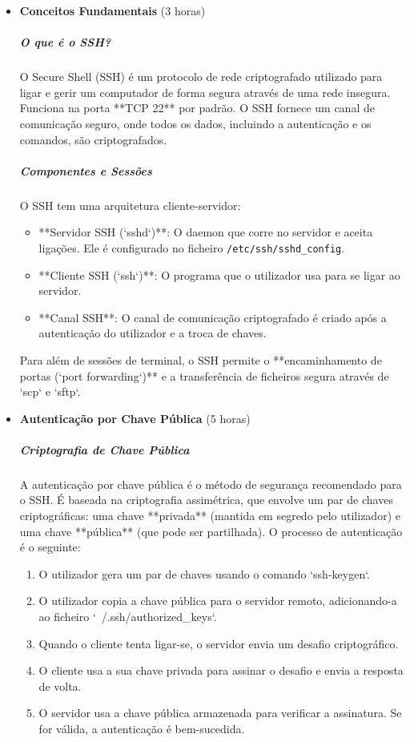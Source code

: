 \documentclass[10pt,a4paper]{article}
\begin{document}
	\begin{itemize}
		\item \textbf{Conceitos Fundamentais} (3 horas)
		\subparagraph{O que é o SSH?} O Secure Shell (SSH) é um protocolo de rede criptografado utilizado para ligar e gerir um computador de forma segura através de uma rede insegura. Funciona na porta **TCP 22** por padrão. O SSH fornece um canal de comunicação seguro, onde todos os dados, incluindo a autenticação e os comandos, são criptografados.
		\subparagraph{Componentes e Sessões} O SSH tem uma arquitetura cliente-servidor:
		\begin{itemize}
			\item **Servidor SSH (`sshd`)**: O daemon que corre no servidor e aceita ligações. Ele é configurado no ficheiro \texttt{/etc/ssh/sshd\_config}.
			\item **Cliente SSH (`ssh`)**: O programa que o utilizador usa para se ligar ao servidor.
			\item **Canal SSH**: O canal de comunicação criptografado é criado após a autenticação do utilizador e a troca de chaves.
		\end{itemize}
		Para além de sessões de terminal, o SSH permite o **encaminhamento de portas (`port forwarding`)** e a transferência de ficheiros segura através de `scp` e `sftp`.
		
		\item \textbf{Autenticação por Chave Pública} (5 horas)
		\subparagraph{Criptografia de Chave Pública} A autenticação por chave pública é o método de segurança recomendado para o SSH. É baseada na criptografia assimétrica, que envolve um par de chaves criptográficas: uma chave **privada** (mantida em segredo pelo utilizador) e uma chave **pública** (que pode ser partilhada). O processo de autenticação é o seguinte:
		\begin{enumerate}
			\item O utilizador gera um par de chaves usando o comando `ssh-keygen`.
			\item O utilizador copia a chave pública para o servidor remoto, adicionando-a ao ficheiro `~/.ssh/authorized_keys`.
			\item Quando o cliente tenta ligar-se, o servidor envia um desafio criptográfico.
			\item O cliente usa a sua chave privada para assinar o desafio e envia a resposta de volta.
			\item O servidor usa a chave pública armazenada para verificar a assinatura. Se for válida, a autenticação é bem-sucedida.
		\end{enumerate}
		

\end{itemize}
\end{document}

